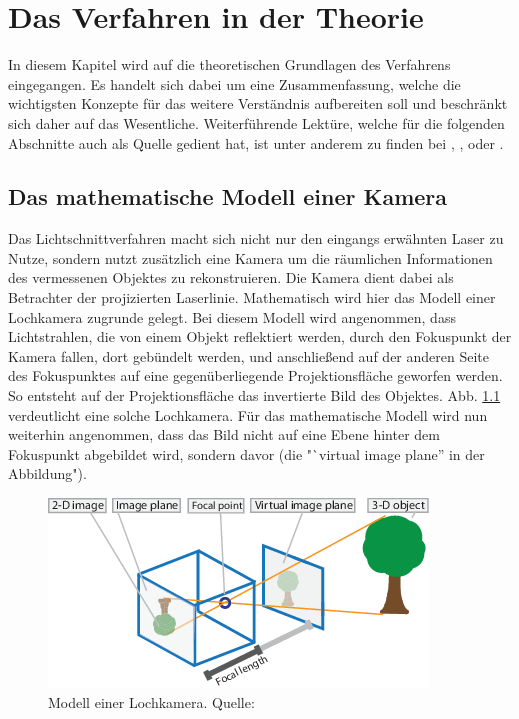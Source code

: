 \chapter{Das Verfahren in der Theorie}
In diesem Kapitel wird auf die theoretischen Grundlagen des Verfahrens eingegangen. Es handelt sich dabei um eine Zusammenfassung, welche die wichtigsten Konzepte für das weitere Verständnis aufbereiten soll und beschränkt sich daher auf das Wesentliche. Weiterführende Lektüre, welche für die folgenden Abschnitte auch als Quelle gedient hat, ist unter anderem zu finden bei \cite{Zhang:00}, \cite{Rahmann}, \cite{Simek:12} oder \cite{Mathworks:17b}.

\section{Das mathematische Modell einer Kamera}
Das Lichtschnittverfahren macht sich nicht nur den eingangs erwähnten Laser zu Nutze, sondern nutzt zusätzlich eine Kamera um die räumlichen Informationen des vermessenen Objektes zu rekonstruieren. Die Kamera dient dabei als Betrachter der projizierten Laserlinie. Mathematisch wird hier das Modell einer Lochkamera zugrunde gelegt. Bei diesem Modell wird angenommen, dass Lichtstrahlen, die von einem Objekt reflektiert werden, durch den Fokuspunkt der Kamera fallen, dort gebündelt werden, und anschließend auf der anderen Seite des Fokuspunktes auf eine gegenüberliegende Projektionsfläche geworfen werden. So entsteht auf der Projektionsfläche das invertierte Bild des Objektes. Abb. \ref{fig:lochkamera} verdeutlicht eine solche Lochkamera. Für das mathematische Modell wird nun weiterhin angenommen, dass das Bild nicht auf eine Ebene hinter dem Fokuspunkt abgebildet wird, sondern davor (die "`virtual image plane'' in der Abbildung").

\begin{figure}
\centering \includegraphics{images/lochkamera.png}
\caption[Modell einer Lochkamera]{Modell einer Lochkamera. Quelle: \cite{Mathworks:17b}}\label{fig:lochkamera}
\end{figure}

